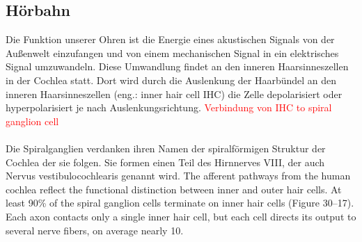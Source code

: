 \documentclass[12pt,a4paper,pdftex]{article}
\begin{document}
\subsection{Hörbahn}

Die Funktion unserer Ohren ist die Energie eines akustischen Signals von der Außenwelt einzufangen und von einem mechanischen Signal in ein elektrisches Signal umzuwandeln. Diese Umwandlung findet an den inneren Haarsinneszellen in der Cochlea statt. Dort wird durch die Auslenkung der Haarbündel an den inneren Haarsinneszellen (eng.: inner hair cell IHC) die Zelle depolarisiert oder hyperpolarisiert je nach Auslenkungsrichtung. 
\textcolor{red}{Verbindung von IHC to spiral ganglion cell}
\\
\\
Die Spiralganglien verdanken ihren Namen der spiralförmigen Struktur der Cochlea der sie folgen. Sie formen einen Teil des Hirnnerves VIII, der auch Nervus vestibulocochlearis genannt wird. The afferent pathways from the human cochlea
        reflect the functional distinction between inner and
        outer hair cells. At least 90\% of the spiral ganglion
        cells terminate on inner hair cells (Figure 30–17). Each
        axon contacts only a single inner hair cell, but each cell
        directs its output to several nerve fibers, on average
        nearly 10.
\end{document}
